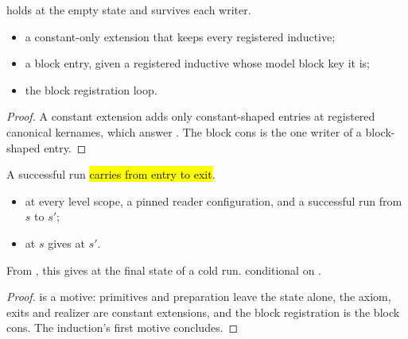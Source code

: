 \begin{lemma}
\label{lem:RegKeyed-indCons}
\leanok
{}
  holds at the empty state and survives each writer.
\begin{itemize}
\item a constant-only extension that keeps every registered inductive;
\item a block entry, given a registered inductive whose model block key it is;
\item the block registration loop.
\end{itemize}
\end{lemma}
\begin{proof}
\leanok
{}
 A constant extension adds only constant-shaped entries at registered canonical kernames,
which answer . The block cons is the one writer of a block-shaped entry.
\end{proof}
\begin{theorem}
\label{thm:regKeyed_of_run}
\leanok
{}
 A successful  run \hl{carries  from entry to exit}.
\begin{itemize}
\item {}  at every level scope, a pinned reader configuration, and a
successful run from $s$ to $s'$;
\item {}  at $s$ gives  at $s'$.
\end{itemize}
 From , this gives  at the final state of a cold run.
 \stProved{} conditional on \stAssumed{} .
\end{theorem}
\begin{proof}
\leanok
{}
  is a  motive: primitives and preparation leave the state
alone, the axiom, exits and realizer are constant extensions, and the block registration is the block
cons. The induction's first motive concludes.
\end{proof}
